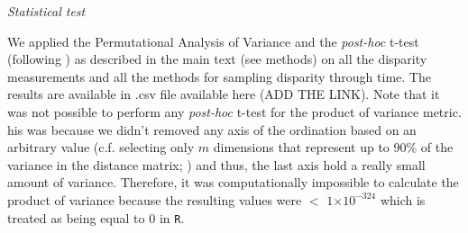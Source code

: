 \documentclass[12pt,letterpaper]{article}
\renewcommand{\subsection}[1]{%
\bigskip
\begin{center}
\begin{large}
\normalfont\itshape #1
\end{large}
\end{center}}
\begin{document}
\subsection{Statistical test}
We applied the Permutational Analysis of Variance \citep{permanova} and the \textit{post-hoc} t-test (following \citealt{Anderson2011}) as described in the main text (see methods) on all the disparity measurements and all the methods for sampling disparity through time.
The results are available in .csv file available here (ADD THE LINK).
Note that it was not possible to perform any \textit{post-hoc} t-test for the product of variance metric.
his was because we didn't removed any axis of the ordination based on an arbitrary value (c.f. selecting only $m$ dimensions that represent up to 90\% of the variance in the distance matrix; \citealt{Brusatte12092008,toljagictriassic-jurassic2013}) and thus, the last axis hold a really small amount of variance.
Therefore, it was computationally impossible to calculate the product of variance because the resulting values were $<$ $1$$\times$$10^{-324}$ which is treated as being equal to $0$ in \texttt{R}.






\end{document}
